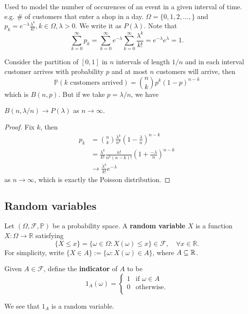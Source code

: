 \begin{example}
    Used to model the number of occurences of an event in a given interval of time. e.g. \# of customers that enter a shop in a day. $ \Omega=\{0,1,2,\dots,\} $ and $ p_k = e^{-\lambda}\frac{\lambda^k}{k!}, k\in \Omega, \lambda>0 $. We write it as $ P(\lambda) $. Note that 
    \[
        \sum_{k=0}^{\infty}p_k=\sum_{k=0}^{\infty} e^{-\lambda}\sum_{k=0}^{\infty}\frac{\lambda^k}{k!}=e^{-\lambda}e^\lambda=1.
    \]
\end{example}

Consider the partition of $[0,1]$ in $n$ intervals of length $1/n$ and in each interval customer arrives with probability $p$ and at most $n$ customers will arrive, then
$$\mathbb P(\text{$k$ customers arrived})=\binom{n}{k}p^k(1-p)^{n-k}$$
which is $B(n,p)$.
But if we take $p=\lambda/n$, we have
\begin{proposition}
    $B(n,\lambda/n)\to P(\lambda)$ as $n\to\infty$.
\end{proposition}
\begin{proof}
    Fix $k$, then
    \begin{align*}
        p_k&=\binom{n}{k}\frac{\lambda^k}{n^k}\left(1-\frac{\lambda}{n}\right)^{n-k}\\
        &=\frac{\lambda^k}{k!}\frac{n!}{n^k(n-k)!}(1+\frac{-\lambda}{n})^{n-k}\\
        &\to\frac{\lambda^k}{k!}e^{-\lambda}
    \end{align*}
    as $n\to\infty$, which is exactly the Poisson distribution.
\end{proof}

\subsection{Random variables}
\begin{definition}
    Let $ (\Omega,\mathscr{F},\mathbb{P}) $ be a probability space. A \textbf{random variable} $X$ is a function $ X: \Omega\to \mathbb{R} $ satisfying 
    \[
        \{X\le x\}=\{\omega\in \Omega: X(\omega)\le x\}\in \mathscr{F},\quad \forall x\in \mathbb{R}.
    \]
    For simplicity, write $ \{X\in A\}:= \{\omega:X(\omega)\in A\} $, where $A \subseteq {\mathbb{R}}$.
\end{definition}

\begin{definition}
    Given $ A\in \mathscr{F} $, define the \textbf{indicator} of $A$ to be 
    \[
        1_A (\omega) = \begin{cases}
        1 &\text{if } \omega\in A\\
        0 &\text{otherwise.}\\
        \end{cases} 
    \]
\end{definition}
We see that $1_A$ is a random variable.

